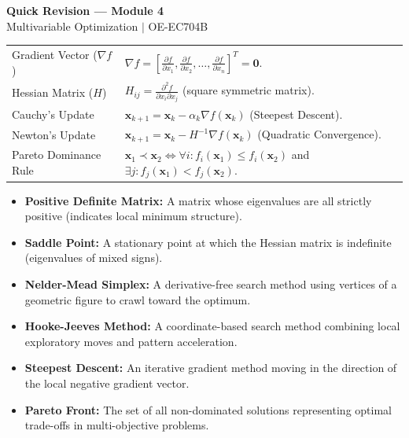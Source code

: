 \documentclass[12pt,a4paper]{article}
\renewcommand{\arraystretch}{1.45}
\begin{document}
\newpage

\begin{center}
  {\large\bfseries\color{myred} Quick Revision --- Module 4}\\[3pt]
  {\small\color{mydark} Multivariable Optimization $|$ OE-EC704B}
\end{center}
\noindent{\color{myred}\rule{\linewidth}{1.2pt}}
\vspace{4pt}

\begin{tcolorbox}[formulabox, title={\textbf{Key Concepts \& Mathematical Rules}}]
\renewcommand{\arraystretch}{1.45}
\begin{tabularx}{\linewidth}{B{5.0cm} X}
Gradient Vector ($\nabla f$) & $\nabla f = \left[ \frac{\partial f}{\partial x_1}, \frac{\partial f}{\partial x_2}, \dots, \frac{\partial f}{\partial x_n} \right]^T = \mathbf{0}$. \\[4pt]
Hessian Matrix ($H$) & $H_{ij} = \frac{\partial^2 f}{\partial x_i \partial x_j}$ \quad (square symmetric matrix). \\[4pt]
Cauchy's Update & $\mathbf{x}_{k+1} = \mathbf{x}_k - \alpha_k \nabla f(\mathbf{x}_k)$ \quad (Steepest Descent). \\[4pt]
Newton's Update & $\mathbf{x}_{k+1} = \mathbf{x}_k - H^{-1} \nabla f(\mathbf{x}_k)$ \quad (Quadratic Convergence). \\[4pt]
Pareto Dominance Rule & $\mathbf{x}_1 \prec \mathbf{x}_2 \iff \forall i: f_i(\mathbf{x}_1) \le f_i(\mathbf{x}_2)$ and $\exists j: f_j(\mathbf{x}_1) < f_j(\mathbf{x}_2)$. \\
\end{tabularx}
\end{tcolorbox}

\begin{tcolorbox}[defbox, title={\textbf{One-Line Definitions}}]
\begin{itemize}[leftmargin=*, itemsep=2.5pt, topsep=0pt]
  \item \textbf{Positive Definite Matrix:} A matrix whose eigenvalues are all strictly positive (indicates local minimum structure).
  \item \textbf{Saddle Point:} A stationary point at which the Hessian matrix is indefinite (eigenvalues of mixed signs).
  \item \textbf{Nelder-Mead Simplex:} A derivative-free search method using vertices of a geometric figure to crawl toward the optimum.
  \item \textbf{Hooke-Jeeves Method:} A coordinate-based search method combining local exploratory moves and pattern acceleration.
  \item \textbf{Steepest Descent:} An iterative gradient method moving in the direction of the local negative gradient vector.
  \item \textbf{Pareto Front:} The set of all non-dominated solutions representing optimal trade-offs in multi-objective problems.
\end{itemize}
\end{tcolorbox}
\end{document}
